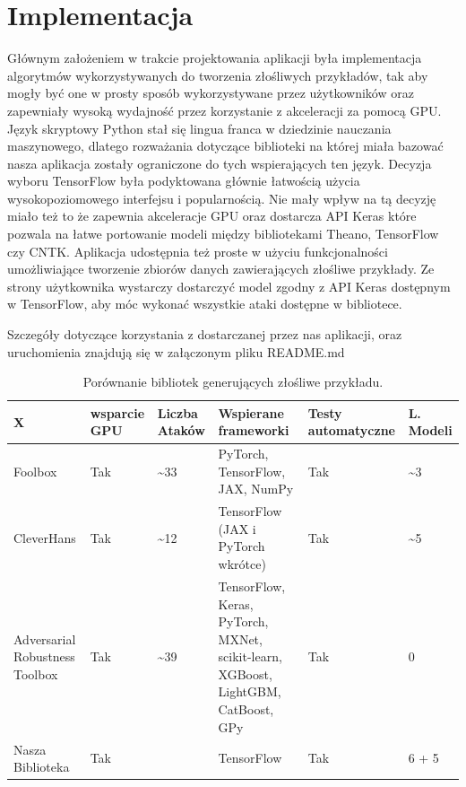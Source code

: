 \documentclass[
    left=2.5cm,         %
    right=2.5cm,        %
    top=2.5cm,          %
    bottom=3cm,         %
    bindingoffset=6mm,  %
    nohyphenation=false %
]{eiti/eiti-thesis}
\begin{document}
\section{Implementacja}
Głównym założeniem w trakcie projektowania aplikacji była implementacja algorytmów wykorzystywanych do
tworzenia złośliwych przykładów, tak aby mogły być one w prosty sposób wykorzystywane przez użytkowników oraz zapewniały
wysoką wydajność przez korzystanie z akceleracji za pomocą GPU.
Język skryptowy Python stał się lingua franca w dziedzinie nauczania maszynowego,
dlatego rozważania dotyczące biblioteki na której miała bazować nasza aplikacja zostały ograniczone do tych wspierających ten język.
Decyzja wyboru TensorFlow była podyktowana głównie łatwością użycia wysokopoziomowego interfejsu i popularnością. Nie mały wpływ na tą decyzję miało też to że
zapewnia akceleracje GPU oraz dostarcza API Keras które pozwala na łatwe portowanie modeli między bibliotekami Theano\cite{2016arXiv160502688short}, TensorFlow\cite{DBLP:journals/corr/AbadiABBCCCDDDG16} czy CNTK\cite{cntk}.
Aplikacja udostępnia też proste w użyciu funkcjonalności umożliwiające tworzenie zbiorów danych zawierających złośliwe przykłady.
Ze strony użytkownika wystarczy dostarczyć model zgodny z API Keras dostępnym w TensorFlow, aby móc wykonać wszystkie ataki
dostępne w bibliotece.

Szczegóły dotyczące korzystania z dostarczanej przez nas aplikacji, oraz uruchomienia znajdują się w załączonym pliku README.md

\begin{center}
    \begin{table}[ht]

    \caption{Porównanie bibliotek generujących złośliwe przykładu.}
    \begin{tabular}{|>{\centering}p{2.5cm}|>{\centering}p{2.0cm}|>{\centering}p{2.0cm}|p{5.0cm}|p{1.0cm}|p{1.0cm}|}
        \hline
        X & wsparcie GPU & Liczba Ataków & Wspierane frameworki & Testy automatyczne & L. Modeli\\
        \hline
        Foolbox & Tak\footnotemark[1] & \textasciitilde33 & PyTorch, TensorFlow, JAX, NumPy & Tak & \textasciitilde3\\
        \hline
        CleverHans & Tak\footnotemark[1] & \textasciitilde12 & TensorFlow (JAX i PyTorch wkrótce) & Tak & \textasciitilde5\\
        \hline
        Adversarial Robustness Toolbox & Tak\footnotemark[1] & \textasciitilde39 & TensorFlow, Keras, PyTorch, MXNet, scikit-learn, XGBoost, LightGBM, CatBoost, GPy  & Tak & 0\\
        \hline
        Nasza Biblioteka & Tak & 6 & TensorFlow & Tak & 6 + 5\footnotemark[2] \\
        \hline
    \end{tabular}
    \end{table}
\end{center}
\end{document}
